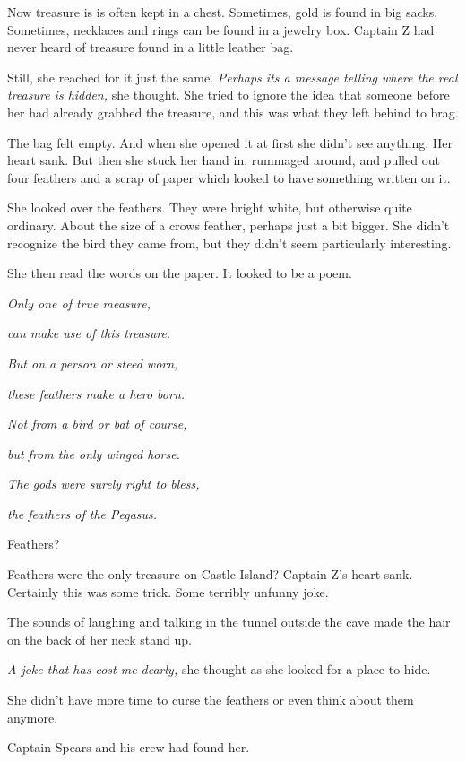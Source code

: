 \documentclass[12pt]{extbook}
\begin{document}
  Now treasure is is often kept in a chest. Sometimes, gold is found in
  big sacks. Sometimes, necklaces and rings can be found in a jewelry box.
  Captain Z had never heard of treasure found in a little leather bag.
  
  Still, she reached for it just the same. \emph{Perhaps its a message
  telling where the real treasure is hidden,} she thought. She tried to
  ignore the idea that someone before her had already grabbed the
  treasure, and this was what they left behind to brag.
  
  The bag felt empty. And when she opened it at first she didn't see
  anything. Her heart sank. But then she stuck her hand in, rummaged
  around, and pulled out four feathers and a scrap of paper which looked
  to have something written on it.
  
  She looked over the feathers. They were bright white, but otherwise
  quite ordinary. About the size of a crows feather, perhaps just a bit
  bigger. She didn't recognize the bird they came from, but they didn't
  seem particularly interesting.
  
  She then read the words on the paper. It looked to be a poem.
  
  \emph{Only one of true measure,}
  
  \emph{can make use of this treasure.}
  
  \emph{But on a person or steed worn,}
  
  \emph{these feathers make a hero born.}
  
  \emph{Not from a bird or bat of course,}
  
  \emph{but from the only winged horse.}
  
  \emph{The gods were surely right to bless,}
  
  \emph{the feathers of the Pegasus.}
  
  Feathers?
  
  Feathers were the only treasure on Castle Island? Captain Z's heart
  sank. Certainly this was some trick. Some terribly unfunny joke.
  
  The sounds of laughing and talking in the tunnel outside the cave made
  the hair on the back of her neck stand up.
  
  \emph{A joke that has cost me dearly,} she thought as she looked for a
  place to hide.
  
  She didn't have more time to curse the feathers or even think about them
  anymore.
  
  Captain Spears and his crew had found her.
  
\end{document}
